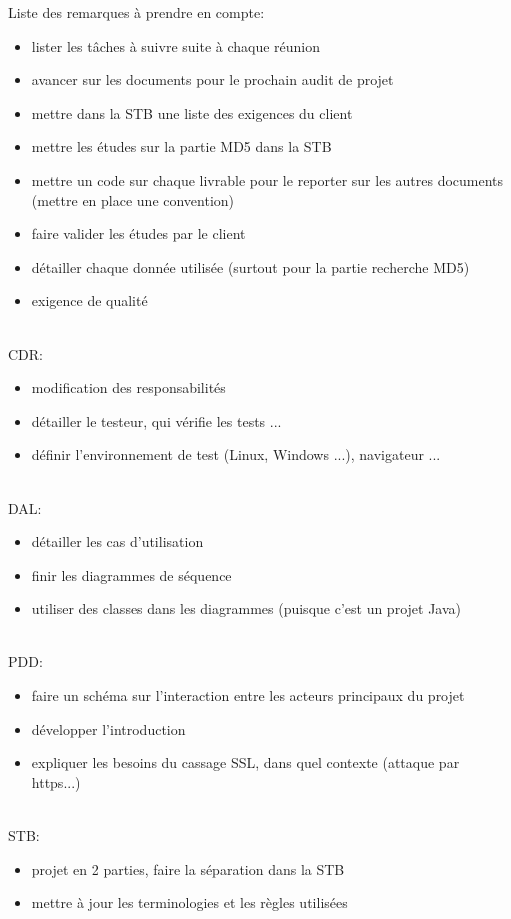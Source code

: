 \documentclass[a4paper,11pt,french]{article}
\begin{document}
Liste des remarques à prendre en compte:
\begin{itemize}
  \item lister les tâches à suivre suite à chaque réunion
  \item avancer sur les documents pour le prochain audit de projet
  \item mettre dans la STB une liste des exigences du client
  \item mettre les études sur la partie MD5 dans la STB
  \item mettre un code sur chaque livrable pour le reporter sur les autres 
  documents (mettre en place une convention)
  \item faire valider les études par le client
  \item détailler chaque donnée utilisée (surtout pour la partie recherche MD5)
  \item exigence de qualité
\end{itemize}
~~\\
CDR:
~~\\
\begin{itemize}
  \item modification des responsabilités
  \item détailler le testeur, qui vérifie les tests ...
  \item définir l'environnement de test (Linux, Windows ...), navigateur ...
\end{itemize}
~~\\
DAL:
~~\\
\begin{itemize}
  \item détailler les cas d'utilisation
  \item finir les diagrammes de séquence
  \item utiliser des classes dans les diagrammes (puisque c'est un projet Java)
\end{itemize}
~~\\
PDD:
~~\\
\begin{itemize}
  \item faire un schéma sur l'interaction entre les acteurs principaux du projet
  \item développer l'introduction
  \item expliquer les besoins du cassage SSL, dans quel contexte (attaque par https...)
\end{itemize}
~~\\
STB:
~~\\
\begin{itemize}
  \item projet en 2 parties, faire la séparation dans la STB
  \item mettre à jour les terminologies et les règles utilisées
\end{itemize}
\end{document}
